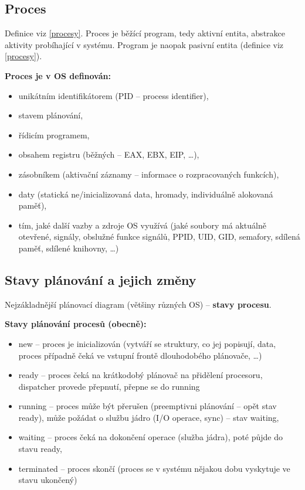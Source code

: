 \documentclass[a4paper, 11pt]{article}
\begin{document}
\subsection{Proces}
Definice viz \ref{procesy}. Proces je běžící program, tedy aktivní entita, abstrakce aktivity probíhající v systému. Program je naopak pasivní entita (definice viz \ref{procesy}).
 
\textbf{Proces je v OS definován:}
\begin{itemize}
    \item unikátním identifikátorem (PID -- process identifier),
    \item stavem plánování,
    \item řídicím programem,
    \item obsahem registru (běžných -- EAX, EBX, EIP, \ldots),
    \item zásobníkem (aktivační záznamy -- informace o rozpracovaných funkcích),
    \item daty (statická ne/inicializovaná data, hromady, individuálně alokovaná paměť),
    \item tím, jaké další vazby a zdroje OS využívá (jaké soubory má aktuálně otevřené, signály, obslužné funkce signálů, PPID, UID, GID, semafory, sdílená paměť, sdílené knihovny, \ldots)
\end{itemize}
 
\subsection{Stavy plánování a jejich změny}
Nejzákladnější plánovací diagram (většiny různých OS) -- \textbf{stavy procesu}.
 
\textbf{Stavy plánování procesů (obecně):}
\begin{itemize}
    \item new -- proces je inicializován (vytváří se struktury, co jej popisují, data, proces případně čeká ve vstupní frontě dlouhodobého plánovače, \ldots)
    \item ready -- proces čeká na krátkodobý plánovač na přidělení procesoru, dispatcher provede přepnutí, přepne se do running
    \item running -- proces může být přerušen (preemptivni plánování -- opět stav ready), může požádat o službu jádro (I/O operace, sync) -- stav waiting,
    \item waiting -- proces čeká na dokončení operace (služba jádra), poté půjde do stavu ready,
    \item terminated -- proces skončí (proces se v systému nějakou dobu vyskytuje ve stavu ukončený)
\end{itemize}
\end{document}
